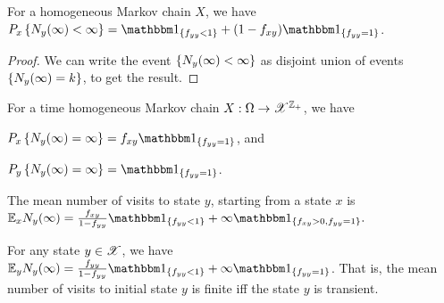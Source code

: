 \documentclass[letterpaper,10pt,english]{article}
\begin{document}
\begin{cor}
\label{cor:01law}
For a homogeneous Markov chain $X$, we have 
$P_x\set{N_y(\infty) < \infty} = \SetIn{f_{yy} < 1} + (1-f_{xy})\SetIn{f_{yy} = 1}$. 
\end{cor}
\begin{proof}
We can write the event $\left\{N_y(\infty) < \infty\right\}$ as disjoint union of events $\left\{N_y(\infty) = k\right\}$, to get the result. 
\end{proof}
\begin{rem} 
For a time homogeneous Markov chain $X: \Omega \to \mathscr{X}^{\mathbb{Z}_+}$, we have 
\begin{compactenum}[(i)]
\item $P_x\set{N_y(\infty) = \infty} = f_{xy}\SetIn{f_{yy}=1}$, and 
\item $P_y\set{N_y(\infty) = \infty} = \SetIn{f_{yy}=1}$.
\end{compactenum} 
\end{rem}
\begin{cor} 
The mean number of visits to state $y$, starting from a state $x$ is 
$
\E_xN_y(\infty) = \frac{f_{xy}}{1-f_{yy}}\SetIn{f_{yy} < 1} + \infty\SetIn{f_{xy} > 0, f_{yy} = 1}.
$
\end{cor}
\begin{rem} 
For any state $y \in \mathscr{X}$, we have $\E_yN_y(\infty) = \frac{f_{yy}}{1-f_{yy}}\SetIn{f_{yy}<1} + \infty\SetIn{f_{yy}=1}$. 
That is, the mean number of visits to initial state $y$ is finite iff the state $y$ is transient.  
\end{rem}
\end{document}
